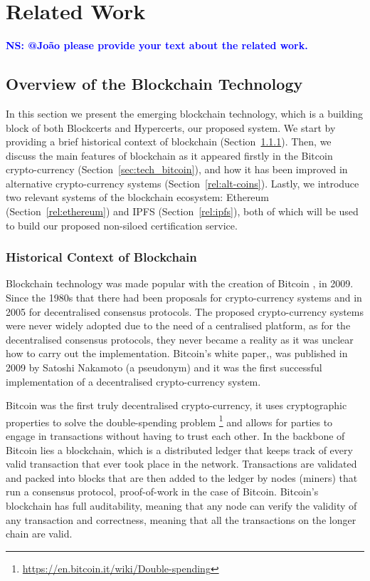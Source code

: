 \documentclass[letterpaper,twocolumn,10pt]{article}
\newcommand{\note}[1]{\textcolor{blue}{\bf #1}}
\begin{document}
\section{Related Work}

\note{NS: @João please provide your text about the related work.}

\subsection{Overview of the Blockchain Technology}
\label{rel:bitcoin}

\noindent In this section we present the emerging blockchain technology, which is a building block of both Blockcerts and Hypercerts, our proposed system. We start by providing a brief historical context of blockchain (Section~\ref{sec:hist}). Then, we discuss the main features of blockchain as it appeared firstly in the Bitcoin crypto-currency (Section~\ref{sec:tech_bitcoin}), and how it has been improved in alternative crypto-currency systems (Section~\ref{rel:alt-coins}). Lastly, we introduce two relevant systems of the blockchain ecosystem: Ethereum (Section~\ref{rel:ethereum}) and IPFS (Section~\ref{rel:ipfs}), both of which will be used to build our proposed non-siloed certification service.

\subsubsection{Historical Context of Blockchain}
\label{sec:hist}

Blockchain technology was made popular with the creation of Bitcoin \cite{Anonymous:JOJGrvgg}, in 2009. Since the 1980s that there had been proposals for crypto-currency systems and in 2005 for decentralised consensus protocols. The proposed crypto-currency systems were never widely adopted due to the need of a centralised platform, as for the decentralised consensus protocols, they never became a reality as it was unclear how to carry out the implementation. Bitcoin's white paper,\cite{Anonymous:JOJGrvgg}, was published in 2009 by Satoshi Nakamoto (a pseudonym) and it was the first successful implementation of a decentralised crypto-currency system.

Bitcoin was the first truly decentralised crypto-currency, it uses cryptographic properties to solve the double-spending problem \footnote{\url{https://en.bitcoin.it/wiki/Double-spending}} and allows for parties to engage in transactions without having to trust each other. In the backbone of Bitcoin lies a blockchain, which is a distributed ledger that keeps track of every valid transaction that ever took place in the network. Transactions are validated and packed into blocks that are then added to the ledger by nodes (miners) that run a consensus protocol, proof-of-work in the case of Bitcoin. Bitcoin's blockchain has full auditability, meaning that any node can verify the validity of any transaction and correctness, meaning that all the transactions on the longer chain are valid.
\end{document}
